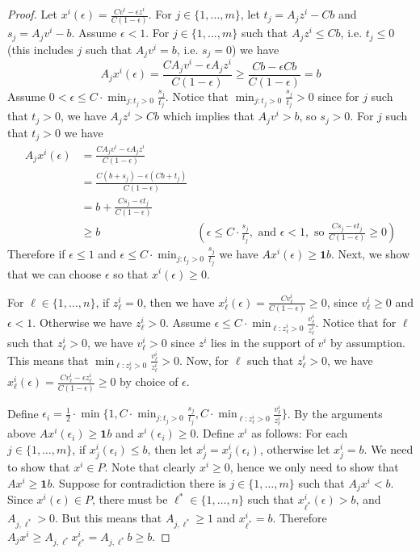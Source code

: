 \begin{proof}
	
	Let $x^i(\epsilon) = \frac{Cv^i-\epsilon z^i}{C(1-\epsilon)}$. For $j\in \{1,\ldots,m\}$, let $t_j = A_jz^i-Cb$ and $s_j=A_jv^i-b$. 
	Assume $\epsilon <1$. For $j\in \{1,\ldots,m\}$ such that $A_jz^i\leq Cb$, i.e. $t_j\leq 0$ (this includes $j$ such that $A_jv^i=b$, i.e. $s_j=0$) we have
	\begin{equation*}
	A_j x^i(\epsilon) = \frac{CA_jv^i-\epsilon A_jz^i}{C(1-\epsilon)}\geq \frac{Cb-\epsilon Cb}{C(1-\epsilon)}=b
	\end{equation*}
	Assume $0< \epsilon \leq C\cdot\min_{j: t_j >0} \frac{s_j}{t_j}$. Notice that $\min_{j: t_j >0} \frac{s_j}{t_j}>0$ since for $j$ such that $t_j>0$, we have $A_jz^i > Cb$ which implies that $A_jv^i>b$, so $s_j>0$. For $j$ such that $t_j>0$ we have
	\begin{align*}
	A_jx^i(\epsilon) &= \frac{CA_jv^i-\epsilon A_jz^i}{C(1-\epsilon)}& \\
	&= \frac{C(b+s_j)-\epsilon (Cb+t_j)}{C(1-\epsilon)}&\\
	&= b+ \frac{Cs_j-\epsilon t_j}{C(1-\epsilon)}&\\
	&\geq b & (\epsilon  \leq C\cdot  \frac{s_j}{t_j}, \mbox{ and } \epsilon <1, \mbox{ so } \frac{Cs_j-\epsilon t_j}{C(1-\epsilon)}\geq 0 )
	\end{align*} 
	Therefore if $\epsilon \leq 1$ and $\epsilon \leq C\cdot\min_{j: t_j >0} \frac{s_j}{t_j}$ we have $Ax^i(\epsilon)\geq \textbf{1}b$. Next, we show that we can choose $\epsilon$ so that $ x^i(\epsilon)\geq 0$.
	
	For $\ell\in \{1,\ldots,n\}$, if $z^i_\ell=0$, then we have $x_\ell^i(\epsilon) = \frac{Cv_\ell^i}{C(1-\epsilon)}\geq 0$, since $v^i_\ell\geq 0$ and $\epsilon <1$. Otherwise we have $z^i_\ell>0$. Assume $\epsilon \leq C\cdot \min_{ \ell:z^i_\ell>0}\frac{v^i_\ell}{z^i_\ell}$. Notice that for $\ell$ such that $z^i_\ell>0$, we have $v^i_\ell>0$ since $z^i$ lies in the support of $v^i$ by assumption. This means that $\min_{\ell:z^i_\ell>0}\frac{v^i_\ell}{z^i_\ell}>0$. Now, for $\ell$ such that $z^i_\ell>0$, we have $x^i_\ell(\epsilon) = \frac{Cv_\ell^i-\epsilon z_\ell^i}{C(1-\epsilon)}\geq 0$ by choice of $\epsilon$.
	
	Define $\epsilon_i =\frac{1}{2}\cdot \min\{1, C\cdot \min_{j: t_j >0}\frac{s_j}{t_j},C\cdot\min_{\ell: z^i_\ell>0}\frac{v^i_\ell}{z^i_\ell}\}$. By the arguments above $Ax^i(\epsilon_i)\geq \textbf{1}b$ and $x^i(\epsilon_i)\geq 0$. Define $x^i$ as follows: For each $j\in \{1,\ldots,m\}$, if $x^i_j(\epsilon_i)\leq b$, then let $x^i_j=x^i_j(\epsilon_i)$, otherwise let $x^i_j=b$. We need to show that $x^i\in P$. Note that clearly $x^i\geq 0$, hence we only need to show that $Ax^i\geq \textbf{1}b$. Suppose for contradiction there is $j\in \{1,\ldots,m\}$ such that $A_jx^i <b$. Since $x^i(\epsilon)\in P$, there must be $\ell^*\in\{1,\ldots,n\}$ such that $x^i_{\ell^*}(\epsilon)>b$, and $A_{j,\ell^*}>0$. But this means that $A_{j,\ell^*}\geq 1$ and $x^i_{\ell^*}=b$. Therefore $A_jx^i \geq  A_{j,\ell^*}x^i_{\ell^*}= A_{j,\ell^*}b\geq b$. \end{proof}
